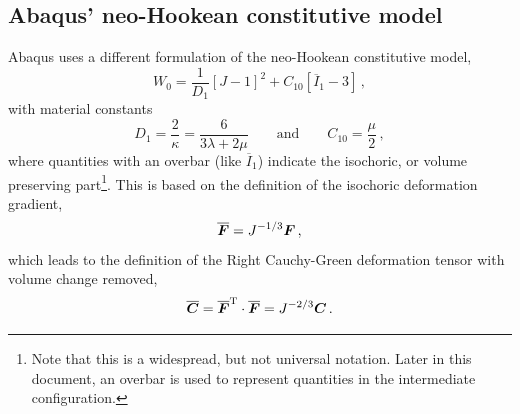 \documentclass[10pt,letterpaper,oneside]{report}
\newcommand{\ten}[1]{\mbox{\boldmath $#1$}{}}
\newcommand{\scas}[1]{\mbox{{\scriptsize{${\rm{#1}}$}}}{}}
\begin{document}
\subsection{Abaqus' neo-Hookean constitutive model}
Abaqus uses a different formulation of the neo-Hookean constitutive model, 
\begin{equation}
W_0 = \frac{1}{D_1} \left[ J - 1 \right]^2 + C_{10} \left[ \overline{I}_1 - 3 \right] \, , 
\end{equation}
with material constants  
\begin{equation}
D_1 = \frac{2}{\kappa} = \frac{6}{3 \lambda + 2 \mu} 
\qquad \text{and} \qquad
C_{10} = \frac{\mu}{2} \, ,
\end{equation}
where quantities with an overbar (like $\overline{I}_1$) indicate the isochoric, or volume preserving part\footnote{Note that this is a widespread, but not universal notation.  Later in this document, an overbar is used to represent quantities in the intermediate configuration.}.  This is based on the definition of the isochoric deformation gradient,
\begin{equation}
\overline{ \ten{F} } = J^{-1/3} \ten{F} \, , 
\end{equation}
which leads to the definition of the Right Cauchy-Green deformation tensor with volume change removed, 
\begin{equation}
\overline{ \ten{C} } = \overline{ \ten{F} }^{\scas{T}} \cdot \overline{ \ten{F} } = J^{-2/3} \ten{C} \, . 
\end{equation}
\end{document}
